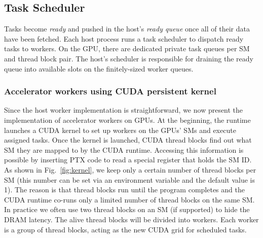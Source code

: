 \subsection{Task Scheduler}
Tasks become {\em ready} and pushed in the host's {\em ready queue} once all of their data have been fetched.
Each host process runs a task scheduler to dispatch ready tasks to workers. On the GPU, there are
dedicated private task queues per SM and thread block pair. The host's scheduler is responsible
for draining the ready queue into available slots on the finitely-sized worker queues.


\subsubsection{Accelerator workers using CUDA persistent kernel}
Since the host worker implementation is straightforward, we now present the implementation of accelerator workers on GPUs.
At the beginning, the runtime launches a CUDA kernel to set up workers on the GPUs' SMs and execute assigned tasks.
Once the kernel is launched, CUDA thread blocks find out what SM they are mapped to by the CUDA runtime.
Accessing this information is possible by inserting PTX code to read a special register that holds the SM ID.
As shown in Fig.~\ref{fig:kernel}, we keep only a certain number of thread blocks per SM (this number can be set via an environment variable and the default value is 1).
The reason is that thread blocks run until the program completes and the CUDA runtime co-runs only a limited number of thread blocks on the same SM.
In practice we often use two thread blocks on an SM (if supported) to hide the DRAM latency.
The alive thread blocks will be divided into workers.
Each worker is a group of thread blocks, acting as the new CUDA grid for scheduled tasks.

